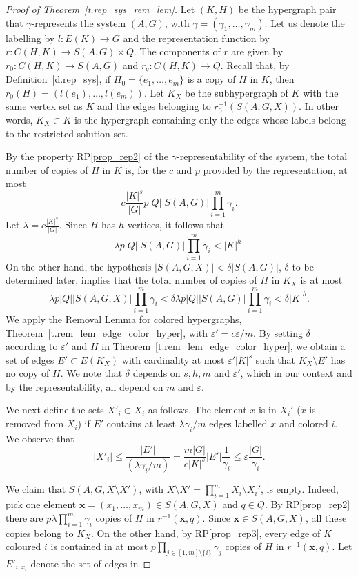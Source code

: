  \begin {proof} 
 [Proof of Theorem~\ref {t.rep_sys_rem_lem}] Let $(K,H)$ be the hypergraph pair that $\gamma $-represents the system $(A,G)$, with $\gamma =(\gamma _1,\ldots ,\gamma _m)$. Let us denote the labelling by $l:E(K)\to G$ and the representation function by $r:C(H,K)\to S(A,G)\times Q$. The components of $r$ are given by $r_0:C(H,K)\to S(A,G)$ and $r_q:C(H,K)\to Q$. Recall that, by Definition~\ref {d.rep_sys}, if $H_0=\{e_1,\ldots ,e_m\}$ is a copy of $H$ in $K$, then $r_0(H)=(l(e_1),\dots ,l(e_m))$. Let $K_X$ be the subhypergraph of $K$ with the same vertex set as $K$ and the edges belonging to $r_0^{-1}(S(A,G,X))$. In other words, $K_X\subset K$ is the hypergraph containing only the edges whose labels belong to the restricted solution set. \par \par By the property RP\ref {prop_rep2} of the $\gamma $-representability of the system, the total number of copies of $H$ in $K$ is, for the $c$ and $p$ provided by the representation, at most $$ c\frac {|K|^s}{ |G|} p |Q||S(A, G)| \prod _{i=1}^m \gamma _i. $$ Let $\lambda =c\frac {|K|^s}{ |G|}$. Since $H$ has $h$ vertices, it follows that $$ \lambda p |Q| |S(A, G)| \prod _{i=1}^m \gamma _i<|K|^h. $$ On the other hand, the hypothesis $|S(A,G,X)|<\delta |S(A,G)|$, $\delta $ to be determined later, implies that the total number of copies of $H$ in $K_X$ is at most $$ \lambda p |Q| |S(A, G, X)| \prod _{i=1}^m \gamma _i < \delta \lambda p|Q| |S(A, G)| \prod _{i=1}^m \gamma _i < \delta |K|^h. $$ We apply the Removal Lemma for colored hypergraphs, Theorem~\ref {t.rem_lem_edge_color_hyper}, with $\varepsilon '=c\varepsilon /m$. By setting $\delta $ according to $\varepsilon '$ and $H$ in Theorem~\ref {t.rem_lem_edge_color_hyper}, we obtain a set of edges $E'\subset E(K_X)$ with cardinality at most $\varepsilon '|K|^s$ such that $K_X \setminus E'$ has no copy of $H$. We note that $\delta $ depends on $s,h,m$ and $\varepsilon '$, which in our context and by the representability, all depend on $m$ and $\varepsilon $. \par We next define the sets $X'_i\subset X_i$ as follows. The element $x$ is in $X_i'$ ($x$ is removed from $X_i$) if $E'$ contains at least $\lambda \gamma _i /m $ edges labelled $x$ and colored $i$. We observe that \begin {displaymath} |X'_i|\le \frac {|E'|}{(\lambda \gamma _i/m)} =\frac {m|G|}{c|K|^s}|E'| \frac {1}{\gamma _i}\le \varepsilon \frac {|G|}{\gamma _i}. \end {displaymath} \par We claim that $S(A,G,X\setminus X')$, with $X\setminus X'=\prod _{i=1}^m X_i\setminus X_i'$, is empty. Indeed, pick one element $\mathbf {x}=(x_1,\ldots ,x_m)\in S(A,G,X)$ and $q\in Q$. By RP\ref {prop_rep2} there are $p\lambda \prod _{i=1}^m \gamma _i$ copies of $H$ in $r^{-1}(\mathbf {x},q)$. Since $\mathbf {x}\in S(A,G,X)$, all these copies belong to $K_X$. On the other hand, by RP\ref {prop_rep3}, every edge of $K$ coloured $i$ is contained in at most $p\prod _{j\in [1,m]\setminus \{i\}} \gamma _j$ copies of $H$ in $r^{-1}(\mathbf {x},q)$. Let $E'_{i,x_i}$ denote the set of edges in 
\end{proof}
